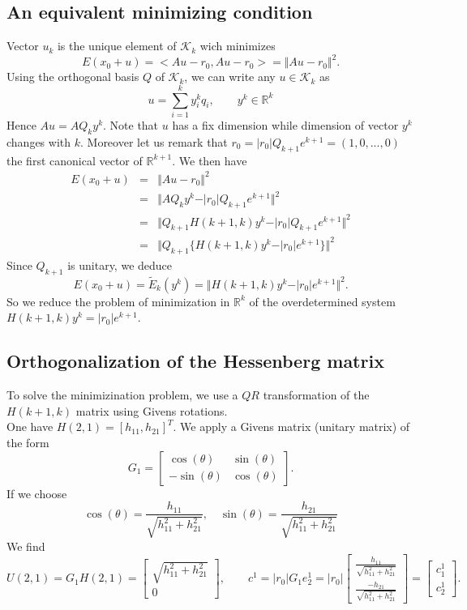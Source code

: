 \documentclass[12pt,a4 paper]{article}
\begin{document}
\subsection{An equivalent minimizing condition}
Vector $u_k$ is the unique element of $\mathcal K_k$ wich minimizes  
$$
E(x_0+u)=<Au-r_0,Au-r_0>=\Vert Au-r_0\Vert^2.
$$ 
Using the orthogonal basis $Q$ 
of $\mathcal K_k$, we can write any $u \in\mathcal K_k$ as
$$
u=\sum_{i=1}^k y^k_i q_i, \qquad y^k\in\mathbb R^k
$$
Hence $Au=AQ_ky^k$. Note that $u$ has a fix dimension while dimension of vector $y^k$ changes with $k$.
Moreover let us remark that $r_0=\vert r_0\vert Q_{k+1}e^{k+1}=(1,0,...,0)$ 
the first canonical vector of $\mathbb R^{k+1}$.
We then have
\begin{eqnarray*}
E(x_0+u)&=&\Vert Au-r_0\Vert^2\\
        &=&\Vert AQ_ky^k-\vert r_0\vert Q_{k+1}e^{k+1} \Vert^2\\
        &=&\Vert Q_{k+1}H(k+1,k)y^k-\vert r_0\vert Q_{k+1}e^{k+1}\Vert^2\\
        &=&\Vert Q_{k+1}\{H(k+1,k)y^k-\vert r_0\vert e^{k+1}\}\Vert^2
\end{eqnarray*}
Since $Q_{k+1}$ is unitary, we deduce
$$
E(x_0+u)=\widetilde E_k(y^k)=\Vert H(k+1,k)y^k-\vert r_0\vert e^{k+1}\Vert^2.
$$
So we reduce the problem of minimization in $\mathbb R^k$ of the overdetermined system $H(k+1,k)y^k=\vert r_0\vert e^{k+1}$.

\subsection{Orthogonalization of the Hessenberg matrix}
To solve the minimizination problem, we use a $QR$ transformation of the  $H(k+1,k)$ matrix using Givens rotations.\\

 One have $H(2,1)=[h_{11},h_{21}]^T$. We apply a Givens matrix (unitary matrix) of the form
$$
G_1=\left [ \begin{array}{cc}
\cos(\theta) & \sin(\theta) \\
-\sin(\theta) & \cos(\theta)
\end{array} \right ].
$$
If we choose 
$$
\cos(\theta)=\frac{h_{11}}{\sqrt{h_{11}^2+h_{21}^2}}, \quad \sin(\theta)=\frac{h_{21}}{\sqrt{h_{11}^2+h_{21}^2}}
$$
We find 
$$
U(2,1)=G_1H(2,1)=\left [ \begin{array}{c}
\sqrt{h_{11}^2+h_{21}^2}\\
0
\end{array} \right ], \qquad
c^1=\vert r_0\vert G_1 e^1_{2}=\vert r_0\vert \left [ \begin{array}{c} 
\displaystyle\frac{h_{11}}{\sqrt{h_{11}^2+h_{21}^2}}\\
\displaystyle\frac{-h_{21}}{\sqrt{h_{11}^2+h_{21}^2}}
\end{array} \right ]=
\left [ \begin{array}{c}
c^1_1 \\c^1_2
\end{array} \right ].
$$
\end{document}
